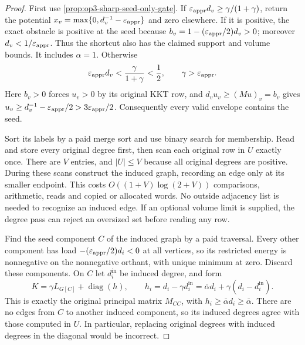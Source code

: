 \begin{proof}
First use \cref{prop:op3-sharp-seed-only-gate}. If
$\varepsilon_{\mathrm{appr}} d_v\geq\gamma/(1+\gamma)$, return the potential
$x_v=\max\{0,d_v^{-1}-\varepsilon_{\mathrm{appr}}\}$ and zero elsewhere.
If it is positive, the exact obstacle is positive at the seed because
$b_v=1-(\varepsilon_{\mathrm{appr}}/2)d_v>0$; moreover $d_v<1/\varepsilon_{\mathrm{appr}}$.
Thus the shortcut also has the claimed support and volume bounds.
It includes $\alpha=1$. Otherwise
\[
 \varepsilon_{\mathrm{appr}} d_v<\frac\gamma{1+\gamma}<\frac12,
 \qquad \gamma>\varepsilon_{\mathrm{appr}}.
\]
Here $b_v>0$ forces $u_v>0$ by its original KKT row, and
$d_vu_v\geq(Mu)_v=b_v$ gives
$u_v\geq d_v^{-1}-\varepsilon_{\mathrm{appr}}/2>3\varepsilon_{\mathrm{appr}}/2$.
Consequently every valid envelope contains the seed.

Sort its labels by a paid merge sort and use binary search for membership.
Read and store every original degree first, then scan each original row
in $U$ exactly once. There are $V$ entries, and $|U|\leq V$ because
all original degrees are positive. During these scans construct the
induced graph, recording an edge only at its smaller endpoint. This
costs $O((1+V)\log(2+V))$ comparisons, arithmetic, reads and copied
or allocated words. No outside adjacency list is needed to recognize
an induced edge. If an optional volume limit is supplied, the degree
pass can reject an oversized set before reading any row.

Find the seed component $C$ of the induced graph by a paid traversal.
Every other component has load $-(\varepsilon_{\mathrm{appr}}/2)d_i<0$ at all vertices,
so its restricted energy is nonnegative on the nonnegative orthant,
with unique minimum at zero. Discard these components. On $C$ let
$d_i^{\mathrm{in}}$ be induced degree, and form
\[
 K=\gamma L_{G[C]}+\operatorname{diag}(h),\qquad
 h_i=d_i-\gamma d_i^{\mathrm{in}}
     =\bar\alpha d_i+\gamma(d_i-d_i^{\mathrm{in}}).
\]
This is exactly the original principal matrix $M_{CC}$, with
$h_i\geq\bar\alpha d_i\geq\bar\alpha$. There are no edges from
$C$ to another induced component, so its induced degrees agree with
those computed in $U$. In particular, replacing original degrees with
induced degrees in the diagonal would be incorrect.


\end{proof}
